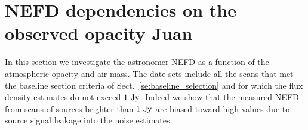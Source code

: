 



\section{NEFD dependencies on the observed opacity {\color{blue} Juan}}
  
In this section we investigate the astronomer NEFD as a function of
the atmospheric opacity and air mass.            
The date sets include all the scans that met the baseline section
criteria of Sect.~\ref{se:baseline_selection} and for which the flux
density estimates do not exceed $1~\rm{Jy}$. Indeed we show that the
measured NEFD from scans of sources brighter than $1~\rm{Jy}$ are
biased toward high values due to source signal leakage into the noise
estimates.



